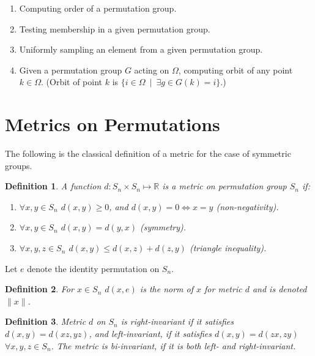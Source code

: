 \documentclass[12pt]{report}
\newcommand{\wsp}{\hspace{6pt}}
\newcommand{\re}{\mathbb{R}}
\newtheorem{definition}{Definition}[section]
\begin{document}
\begin{enumerate}
	\item Computing order of a permutation group.
	\item Testing membership in a given permutation group.
	\item Uniformly sampling an element from a given permutation group.
	\item Given a permutation group $G$ acting on $\Omega$, computing orbit of any point $k \in \Omega$. \newline
	(Orbit of point $k$ is $\{i \in \Omega \wsp | \wsp \exists g \in G(k) = i\}$.)
\end{enumerate}

\newpage


\section{Metrics on Permutations}

\indent \par The following is the classical definition of a metric for the case of symmetric groups.

\begin{definition}
	A function $d : S_n \times S_n \longmapsto \re$ is a metric on permutation group $S_n$ if:
	\begin{enumerate}
		\item $\forall x, y \in S_n$  $d(x, y) \geq 0$, and $d(x, y) = 0 \iff x = y$ (non-negativity).
		\item $\forall x, y \in S_n$ $d(x, y) = d(y, x)$ (symmetry).
		\item $\forall x, y, z \in S_n$ $d(x, y) \leq d(x, z) + d(z, y)$ (triangle inequality).
	\end{enumerate}
\end{definition}

Let $e$ denote the identity permutation on $S_n$.

\begin{definition}
	For $x \in S_n$ $d(x, e)$ is the \textit{norm} of $x$ for metric $d$ and is denoted $\|x\|$.
\end{definition}

\begin{definition}
	Metric $d$ on $S_n$ is right-invariant if it satisfies $d(x, y) = d(xz, yz)$, and left-invariant, if it satisfies $d(x, y) = d(zx, zy)$ $\forall x, y, z \in S_n$.
	The metric is bi-invariant, if it is both left- and right-invariant.
\end{definition}
\end{document}
